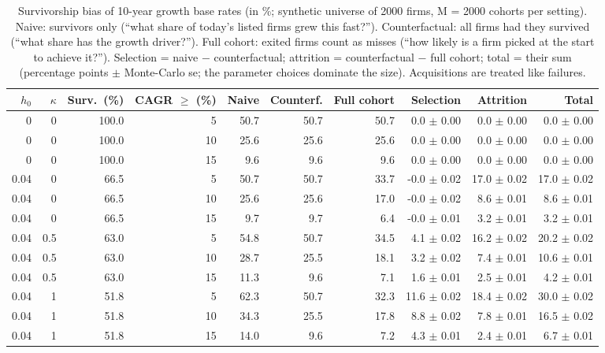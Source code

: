\begin{table}[H]
\centering
\scriptsize
\caption{Survivorship bias of 10-year growth base rates (in \%; synthetic universe of 2000 firms, M = 2000 cohorts per setting). Naive: survivors only (``what share of today's listed firms grew this fast?''). Counterfactual: all firms had they survived (``what share has the growth driver?''). Full cohort: exited firms count as misses (``how likely is a firm picked at the start to achieve it?''). Selection = naive $-$ counterfactual; attrition = counterfactual $-$ full cohort; total = their sum (percentage points $\pm$ Monte-Carlo se; the parameter choices dominate the size). Acquisitions are treated like failures.}
\label{tab:T6_survivorship}
\setlength{\tabcolsep}{3pt}
\begin{tabular}{rrrrrrrrrr}
\toprule
$h_0$ & $\kappa$ & Surv.\ (\%) & CAGR $\ge$ (\%) & Naive & Counterf. & Full cohort & Selection & Attrition & Total \\
\midrule
0 & 0 & 100.0 & 5 & 50.7 & 50.7 & 50.7 & 0.0 $\pm$ 0.00 & 0.0 $\pm$ 0.00 & 0.0 $\pm$ 0.00 \\
0 & 0 & 100.0 & 10 & 25.6 & 25.6 & 25.6 & 0.0 $\pm$ 0.00 & 0.0 $\pm$ 0.00 & 0.0 $\pm$ 0.00 \\
0 & 0 & 100.0 & 15 & 9.6 & 9.6 & 9.6 & 0.0 $\pm$ 0.00 & 0.0 $\pm$ 0.00 & 0.0 $\pm$ 0.00 \\
0.04 & 0 & 66.5 & 5 & 50.7 & 50.7 & 33.7 & -0.0 $\pm$ 0.02 & 17.0 $\pm$ 0.02 & 17.0 $\pm$ 0.02 \\
0.04 & 0 & 66.5 & 10 & 25.6 & 25.6 & 17.0 & -0.0 $\pm$ 0.02 & 8.6 $\pm$ 0.01 & 8.6 $\pm$ 0.01 \\
0.04 & 0 & 66.5 & 15 & 9.7 & 9.7 & 6.4 & -0.0 $\pm$ 0.01 & 3.2 $\pm$ 0.01 & 3.2 $\pm$ 0.01 \\
0.04 & 0.5 & 63.0 & 5 & 54.8 & 50.7 & 34.5 & 4.1 $\pm$ 0.02 & 16.2 $\pm$ 0.02 & 20.2 $\pm$ 0.02 \\
0.04 & 0.5 & 63.0 & 10 & 28.7 & 25.5 & 18.1 & 3.2 $\pm$ 0.02 & 7.4 $\pm$ 0.01 & 10.6 $\pm$ 0.01 \\
0.04 & 0.5 & 63.0 & 15 & 11.3 & 9.6 & 7.1 & 1.6 $\pm$ 0.01 & 2.5 $\pm$ 0.01 & 4.2 $\pm$ 0.01 \\
0.04 & 1 & 51.8 & 5 & 62.3 & 50.7 & 32.3 & 11.6 $\pm$ 0.02 & 18.4 $\pm$ 0.02 & 30.0 $\pm$ 0.02 \\
0.04 & 1 & 51.8 & 10 & 34.3 & 25.5 & 17.8 & 8.8 $\pm$ 0.02 & 7.8 $\pm$ 0.01 & 16.5 $\pm$ 0.02 \\
0.04 & 1 & 51.8 & 15 & 14.0 & 9.6 & 7.2 & 4.3 $\pm$ 0.01 & 2.4 $\pm$ 0.01 & 6.7 $\pm$ 0.01 \\

\end{tabular}
\end{table}
